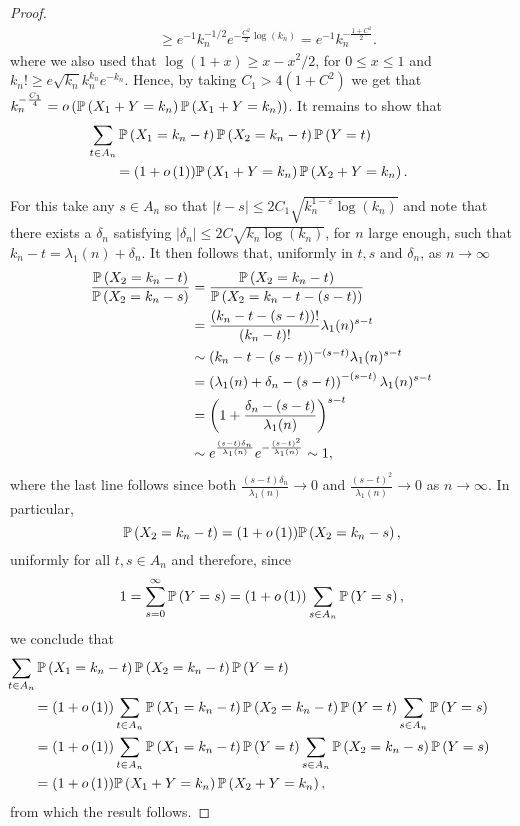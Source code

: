 \begin{proof}
\begin{align*}
	&\ge e^{-1} k_n^{-1/2} e^{ -\frac{C^2}{2} \log(k_n)} = e^{-1} k_n^{-\frac{1+C^2}{2}}.
\end{align*}
where we also used that $\log(1+x) \ge x - x^2/2$, for $0\le x \le 1$ and $k_n! \ge e \sqrt{k_n} k_n^{k_n} e^{-k_n}$. Hence, by taking $C_1 > 4(1 + C^2)$ we get that $k_n^{-\frac{C_1}{4}} = o\left(\mathbb{P}\left(X_1 + Y = k_n\right)\mathbb{P}\left(X_1 + Y = k_n\right)\right)$. It remains to show that 
\begin{align*}
	&\hspace{-20pt}\sum_{t \in A_n} \Prob{X_1 = k_n - t}\Prob{X_2 = k_n - t}\Prob{Y = t}\\
	&= (1 + \smallO{1}) \Prob{X_1 + Y = k_n} \Prob{X_2 + Y = k_n}.
\end{align*}

For this take any $s \in A_n$ so that $|t-s| \le 2 C_1 \sqrt{k_n^{1-\varepsilon}\log(k_n)}$ and note that there exists a $\delta_n$ satisfying $|\delta_n| \le 2C \sqrt{k_n \log(k_n)}$, for $n$ large enough, such that $k_n - t = \lambda_1(n) + \delta_n$. It then follows that, uniformly in $t,s$ and $\delta_n$, as $n \to \infty$
\begin{align*}
	\frac{\mathbb{P}\left(X_2 = k_n - t\right)}{\mathbb{P}\left(X_2 = k_n - s\right)}
	&= \frac{\mathbb{P}\left(X_2 = k_n - t\right)}{\mathbb{P}\left(X_2 = k_n - t - (s - t)\right)}\\
	&= \frac{(k_n - t - (s-t))!}{(k_n - t)!} \lambda_1(n)^{s - t} \\
	&\sim (k_n - t - (s-t))^{-(s-t)} \lambda_1(n)^{s-t} \\
	&= \left(\lambda_1(n) + \delta_n - (s-t)\right)^{-(s-t)}\lambda_1(n)^{s-t}\\
	&= \left(1 + \frac{\delta_n -(s-t)}{\lambda_1(n)}\right)^{s-t}\\
	&\sim e^{\frac{(s-t)\delta_n}{\lambda_1(n)}} e^{-\frac{(s-t)^2}{\lambda_1(n)}} \sim 1,
\end{align*}
where the last line follows since both $\frac{(s-t)\delta_n}{\lambda_1(n)} \to 0$ and $\frac{(s-t)^2}{\lambda_1(n)} \to 0$ as $n \to \infty$. In particular,
\[
	\mathbb{P}\left(X_2 = k_n - t\right) = (1+o\left(1\right)) \mathbb{P}\left(X_2 = k_n - s\right),
\] 
uniformly for all $t, s \in A_n$ and therefore, since
\[
	1 = \sum_{s = 0}^\infty \mathbb{P}\left(Y = s\right) = (1+o\left(1\right)) \sum_{s \in A_n} \mathbb{P}\left(Y = s\right),
\]
we conclude that
\begin{align*}
	&\hspace{-20pt}\sum_{t \in A_n} \Prob{X_1 = k_n - t}\Prob{X_2 = k_n - t}\Prob{Y = t}\\
	&= (1+\smallO{1}) \sum_{t \in A_n} \Prob{X_1 = k_n - t}\Prob{X_2 = k_n - t}\Prob{Y = t} \sum_{s \in A_n} \Prob{Y = s}\\
	&= (1 + \smallO{1}) \sum_{t \in A_n} \Prob{X_1 = k_n - t}\Prob{Y = t} 
		\sum_{s \in A_n} \Prob{X_2 = k_n - s} \Prob{Y = s}\\
	&= (1 + \smallO{1}) \Prob{X_1 + Y = k_n} \Prob{X_2 + Y = k_n},
\end{align*}
from which the result follows.
\end{proof}


